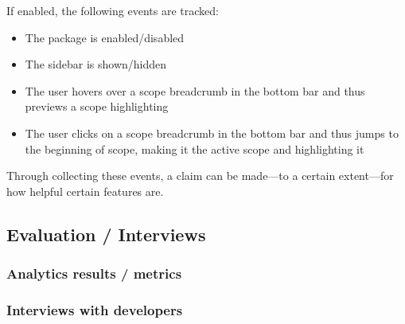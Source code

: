 If enabled, the following events are tracked:

\begin{itemize}
\itemsep1pt\parskip0pt
\item
  The package is enabled/disabled
\item
  The sidebar is shown/hidden
\item
  The user hovers over a scope breadcrumb in the bottom bar and thus
  previews a scope highlighting
\item
  The user clicks on a scope breadcrumb in the bottom bar and thus jumps
  to the beginning of scope, making it the active scope and highlighting
  it
\end{itemize}

Through collecting these events, a claim can be made—to a certain
extent—for how helpful certain features are.

\subsection{Evaluation / Interviews}\label{evaluation-interviews}

\subsubsection{Analytics results /
metrics}\label{analytics-results-metrics}

\subsubsection{Interviews with
developers}\label{interviews-with-developers}
